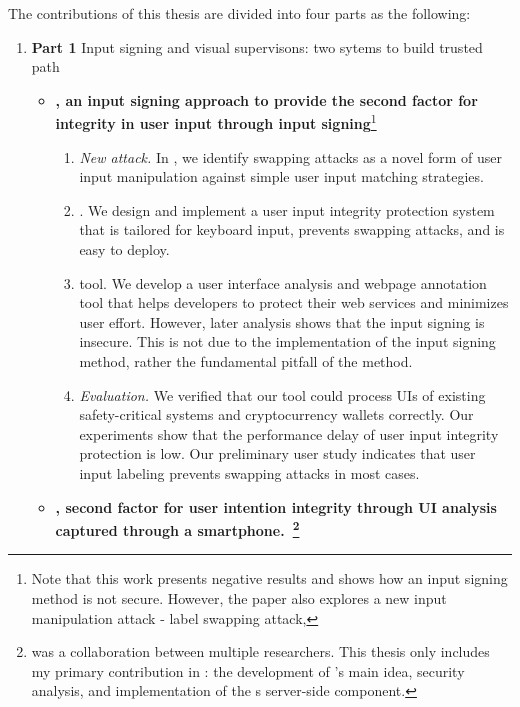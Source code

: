 The contributions of this thesis are divided into four parts as the following:

\begin{enumerate}[leftmargin=*]
  
  \item[] \textbf{Part 1} Input signing and visual supervisons: two sytems to build trusted path
  
  \begin{itemize}
  \item \textbf{\integrikey, an input signing approach to provide the second factor for integrity in user input through input signing}\footnote{Note that this work presents negative results and shows how an input signing method is not secure. However, the paper also explores a new input manipulation attack - label swapping attack,}

\begin{enumerate}
    \item \emph{New attack.} In \integrikey, we identify swapping attacks as a novel form of user input manipulation against simple user input matching strategies.
    \item \integrikey. We design and implement a user input integrity protection system that is tailored for keyboard input, prevents swapping attacks, and is easy to deploy.
    \item \integrikey{} tool. We develop a user interface analysis and webpage annotation tool that helps developers to protect their web services and minimizes user effort. However, later analysis shows that the input signing is insecure. This is not due to the implementation of the input signing method, rather the fundamental pitfall of the method.
    \item \emph{Evaluation.} We verified that our tool could process UIs of existing safety-critical systems and cryptocurrency wallets correctly. Our experiments show that the performance delay of \integrikey user input integrity protection is low. Our preliminary user study indicates that user input labeling prevents swapping attacks in most cases.
\end{enumerate}

	\item \textbf{\integriscreen, second factor for user intention integrity through UI analysis captured through a smartphone.~\footnote{\integriscreen was a collaboration between multiple researchers. This thesis only includes my primary contribution in \integriscreen: the development of \integriscreen{}'s main idea, security analysis, and implementation of the \integriscreen{}s server-side component.}}


\end{itemize}
\end{enumerate}
